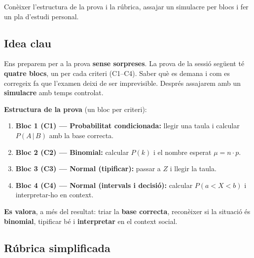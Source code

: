 %
{Conèixer l'estructura de la prova i la rúbrica, assajar un simulacre per blocs i fer un pla d'estudi personal.}

\subsection{Idea clau}

Ens preparem per a la prova \textbf{sense sorpreses}. La prova de la sessió següent té
\textbf{quatre blocs}, un per cada criteri (C1--C4). Saber què es demana i com es
corregeix fa que l'examen deixi de ser imprevisible. Després assajarem amb un
\textbf{simulacre} amb temps controlat.

\begin{idea}
\textbf{Estructura de la prova} (un bloc per criteri):
\begin{enumerate}[leftmargin=1.6em, itemsep=2pt]
  \item \textbf{Bloc 1 (C1) — Probabilitat condicionada:} llegir una taula i calcular
        $P(A\,|\,B)$ amb la base correcta.
  \item \textbf{Bloc 2 (C2) — Binomial:} calcular $P(k)$ i el nombre esperat $\mu=n\cdot p$.
  \item \textbf{Bloc 3 (C3) — Normal (tipificar):} passar a $Z$ i llegir la taula.
  \item \textbf{Bloc 4 (C4) — Normal (intervals i decisió):} calcular $P(a<X<b)$ i
        interpretar-ho en context.
\end{enumerate}
\textbf{Es valora}, a més del resultat: triar la \textbf{base correcta}, reconèixer si la
situació és \textbf{binomial}, tipificar bé i \textbf{interpretar} en el context social.
\end{idea}

\subsection{Rúbrica simplificada}

